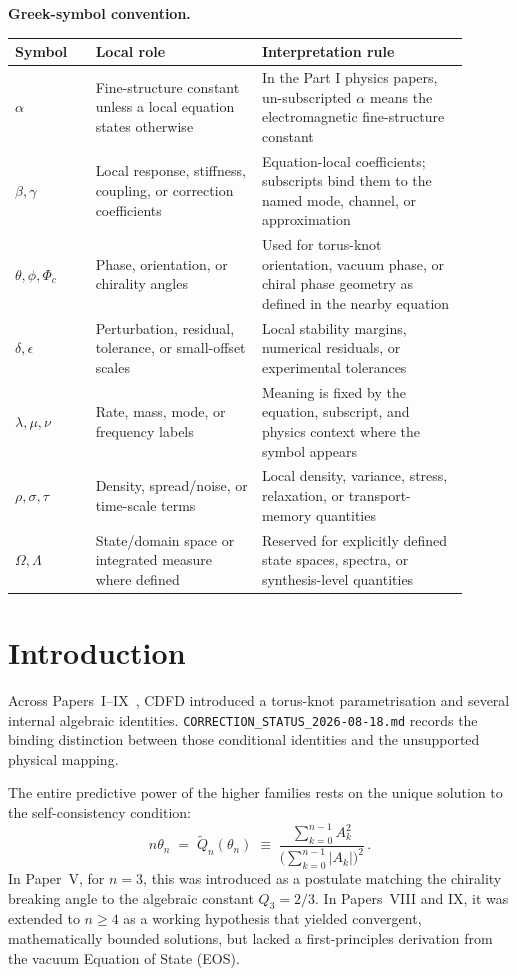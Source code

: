\documentclass[11pt]{article}
\begin{document}
\noindent\textbf{Greek-symbol convention.}
\begin{center}
{\small
\begin{tabular}{p{0.16\linewidth}p{0.33\linewidth}p{0.41\linewidth}}
\hline
Symbol & Local role & Interpretation rule \\
\hline
$\alpha$ & Fine-structure constant unless a local equation states otherwise & In the Part I physics papers, un-subscripted $\alpha$ means the electromagnetic fine-structure constant \\
$\beta,\gamma$ & Local response, stiffness, coupling, or correction coefficients & Equation-local coefficients; subscripts bind them to the named mode, channel, or approximation \\
$\theta,\phi,\Phi_c$ & Phase, orientation, or chirality angles & Used for torus-knot orientation, vacuum phase, or chiral phase geometry as defined in the nearby equation \\
$\delta,\epsilon$ & Perturbation, residual, tolerance, or small-offset scales & Local stability margins, numerical residuals, or experimental tolerances \\
$\lambda,\mu,\nu$ & Rate, mass, mode, or frequency labels & Meaning is fixed by the equation, subscript, and physics context where the symbol appears \\
$\rho,\sigma,\tau$ & Density, spread/noise, or time-scale terms & Local density, variance, stress, relaxation, or transport-memory quantities \\
$\Omega,\Lambda$ & State/domain space or integrated measure where defined & Reserved for explicitly defined state spaces, spectra, or synthesis-level quantities \\
\hline
\end{tabular}
}
\end{center}


\section{Introduction}

Across Papers~I--IX~\cite{MujjabiI2026,MujjabiII2026,MujjabiIII2026,%
MujjabiIV2026,MujjabiV2026,MujjabiVI2026,MujjabiVII2026,MujjabiVIII2026,MujjabiIX2026},
CDFD introduced a torus-knot parametrisation and several internal algebraic
identities. \texttt{CORRECTION\_STATUS\_2026-08-18.md} records the binding distinction
between those conditional identities and the unsupported physical mapping.

The entire predictive power of the higher families rests on the unique solution
to the self-consistency condition:
\begin{equation}
  n\theta_n \;=\; \widetilde{Q}_n(\theta_n) \;\equiv\; \frac{\sum_{k=0}^{n-1} A_k^2}{\bigl(\sum_{k=0}^{n-1} |A_k|\bigr)^2}\,.
  \label{eq:self_consistency}
\end{equation}
In Paper~V, for $n=3$, this was introduced as a postulate matching the
chirality breaking angle to the algebraic constant $Q_3 = 2/3$.
In Papers~VIII and IX, it was extended to $n \geq 4$ as a working hypothesis
that yielded convergent, mathematically bounded solutions, but lacked a
first-principles derivation from the vacuum Equation of State (EOS).
\end{document}
